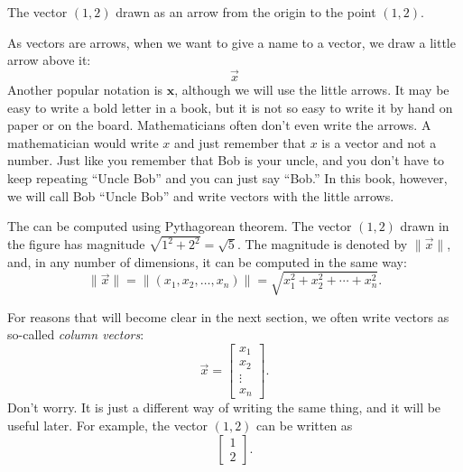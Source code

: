 \documentclass{ximera}
\begin{document}
\begin{myfig}
    \capstart
    
    \caption{The vector $(1,2)$ drawn as an arrow from the origin to the point $(1,2)$.\label{linalg-vecarrow:fig}}
\end{myfig}

As vectors are arrows, when we want to give a name to a vector, we draw a little arrow above it:
\begin{equation*}
    \vec{x}
\end{equation*}
Another popular notation is $\mathbf{x}$, although we will use the little arrows.  It may be easy to write a bold letter in a book, but it is not so easy to write it by hand on paper or on the board. Mathematicians often don't even write the arrows.  A mathematician would write $x$ and just remember that $x$ is a vector and not a number. Just like you remember that Bob is your uncle, and you don't have to keep repeating ``Uncle Bob'' and you can just say ``Bob.'' In this book, however, we will call Bob ``Uncle Bob'' and write vectors with the little arrows.

The \emph{} can be computed using Pythagorean theorem. The vector $(1,2)$ drawn in the figure has magnitude $\sqrt{1^2+2^2} = \sqrt{5}$.  The magnitude is denoted by $\lVert \vec{x} \rVert$, and, in any number of dimensions, it can be computed in the same way:
\begin{equation*}
    \lVert \vec{x} \rVert = \lVert (x_1,x_2,\ldots,x_n) \rVert = \sqrt{x_1^2+x_2^2+\cdots+x_n^2} .
\end{equation*}

For reasons that will become clear in the next section, we often write vectors as so-called \emph{column vectors}:
\begin{equation*}
    \vec{x} = 
    \begin{bmatrix}
        x_{1} \\ x_2 \\ \vdots \\ x_n
    \end{bmatrix} .
\end{equation*}
Don't worry.  It is just a different way of writing the same thing, and it will be useful later.  For example, the vector $(1,2)$ can be written as
\begin{equation*}
    \begin{bmatrix}
    1 \\ 2
    \end{bmatrix} .
\end{equation*}
\end{document}
